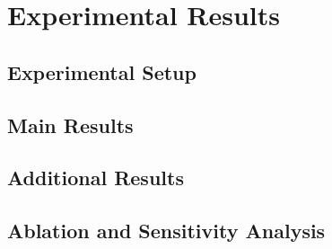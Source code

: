 \section{Experimental Results}\label{sec:results}

\subsection{Experimental Setup}\label{sec:results:setup}

\subsection{Main Results}\label{sec:results:main}

\subsection{Additional Results}\label{sec:results:additional}

\subsection{Ablation and Sensitivity Analysis}\label{sec:results:ablation}
